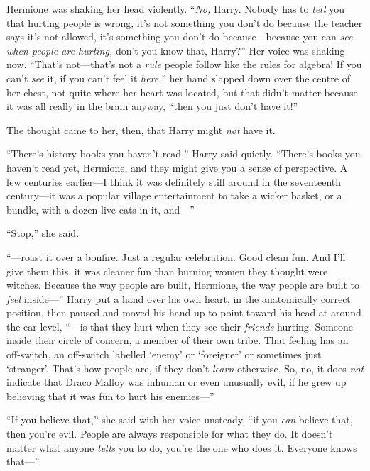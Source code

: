 Hermione was shaking her head violently. “\emph{No,} Harry. Nobody has to \emph{tell} you that hurting people is wrong, it’s not something you don’t do because the teacher says it’s not allowed, it’s something you don’t do because—because you can \emph{see when people are hurting,} don’t you know that, Harry?” Her voice was shaking now. “That’s not—that’s not a \emph{rule} people follow like the rules for algebra! If you can’t \emph{see} it, if you can’t feel it \emph{here,}” her hand slapped down over the centre of her chest, not quite where her heart was located, but that didn’t matter because it was all really in the brain anyway, “then you just don’t have it!”

The thought came to her, then, that Harry might \emph{not} have it.

“There’s history books you haven’t read,” Harry said quietly. “There’s books you haven’t read yet, Hermione, and they might give you a sense of perspective. A few centuries earlier—I think it was definitely still around in the seventeenth century—it was a popular village entertainment to take a wicker basket, or a bundle, with a dozen live cats in it, and—”

“Stop,” she said.

“—roast it over a bonfire. Just a regular celebration. Good clean fun. And I’ll give them this, it was cleaner fun than burning women they thought were witches. Because the way people are built, Hermione, the way people are built to \emph{feel} inside—” Harry put a hand over his own heart, in the anatomically correct position, then paused and moved his hand up to point toward his head at around the ear level, “—is that they hurt when they see their \emph{friends} hurting. Someone inside their circle of concern, a member of their own tribe. That feeling has an off-switch, an off-switch labelled ‘enemy’ or ‘foreigner’ or sometimes just ‘stranger’. That’s how people are, if they don’t \emph{learn} otherwise. So, no, it does \emph{not} indicate that Draco Malfoy was inhuman or even unusually evil, if he grew up believing that it was fun to hurt his enemies—”

“If you believe that,” she said with her voice unsteady, “if you \emph{can} believe that, then you’re evil. People are always responsible for what they do. It doesn’t matter what anyone \emph{tells} you to do, you’re the one who does it. Everyone knows that—”


